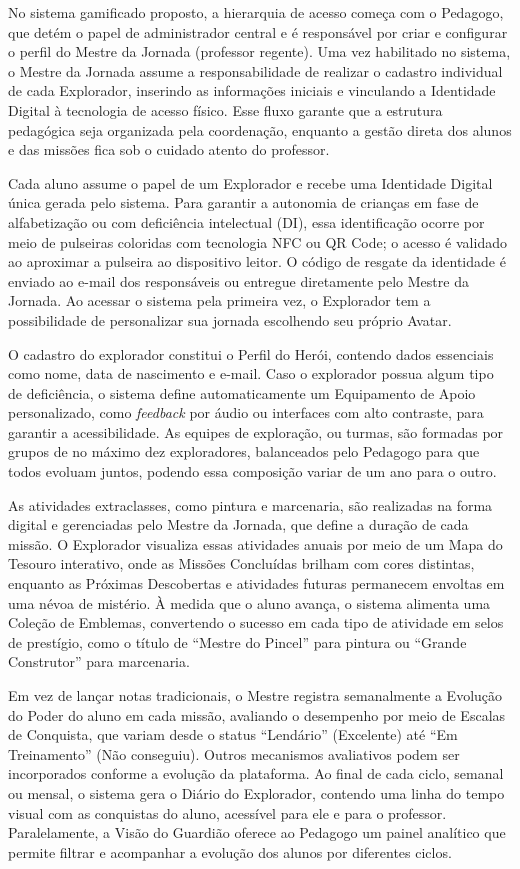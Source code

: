 \documentclass[12pt, a4paper]{article}
\begin{document}
No sistema gamificado proposto, a hierarquia de acesso começa com o Pedagogo,
que detém o papel de administrador central e é responsável por criar e configurar o perfil do
Mestre da Jornada (professor regente). Uma vez habilitado no sistema, o Mestre da Jornada
assume a responsabilidade de realizar o cadastro individual de cada Explorador, inserindo
as informações iniciais e vinculando a Identidade Digital à tecnologia de acesso físico. Esse
fluxo garante que a estrutura pedagógica seja organizada pela coordenação, enquanto a
gestão direta dos alunos e das missões fica sob o cuidado atento do professor.
 
Cada aluno assume o papel de um Explorador e recebe uma Identidade Digital única
gerada pelo sistema. Para garantir a autonomia de crianças em fase de alfabetização ou com
deficiência intelectual (DI), essa identificação ocorre por meio de pulseiras coloridas com
tecnologia NFC ou QR Code; o acesso é validado ao aproximar a pulseira ao dispositivo
leitor. O código de resgate da identidade é enviado ao e-mail dos responsáveis ou
entregue diretamente pelo Mestre da Jornada. Ao acessar o sistema pela primeira vez, o Explorador tem a
possibilidade de personalizar sua jornada escolhendo seu próprio Avatar.
 
O cadastro do explorador constitui o Perfil do Herói, contendo dados essenciais
como nome, data de nascimento e e-mail. Caso o explorador possua algum tipo de
deficiência, o sistema define automaticamente um Equipamento de Apoio personalizado,
como \textit{feedback} por áudio ou interfaces com alto contraste, para garantir a
acessibilidade. As equipes de exploração, ou turmas, são formadas por grupos de no
máximo dez exploradores, balanceados pelo Pedagogo para que todos evoluam juntos,
podendo essa composição variar de um ano para o outro.
 
As atividades extraclasses, como pintura e marcenaria, são realizadas na forma
digital e gerenciadas pelo Mestre da Jornada, que define a duração de cada missão. O
Explorador visualiza essas atividades anuais por meio de um Mapa do Tesouro interativo,
onde as Missões Concluídas brilham com cores distintas, enquanto as Próximas
Descobertas e atividades futuras permanecem envoltas em uma névoa de mistério. À
medida que o aluno avança, o sistema alimenta uma Coleção de Emblemas, convertendo o
sucesso em cada tipo de atividade em selos de prestígio, como o título de ``Mestre do
Pincel'' para pintura ou ``Grande Construtor'' para marcenaria.
 
Em vez de lançar notas tradicionais, o Mestre registra semanalmente a Evolução do
Poder do aluno em cada missão, avaliando o desempenho por meio de Escalas de Conquista,
que variam desde o status ``Lendário'' (Excelente) até ``Em Treinamento'' (Não conseguiu).
Outros mecanismos avaliativos podem ser incorporados conforme a evolução da plataforma. Ao final de cada ciclo, semanal ou mensal, o sistema gera o Diário do
Explorador, contendo uma linha do tempo visual com as conquistas do aluno, acessível para
ele e para o professor. Paralelamente, a Visão do Guardião oferece ao Pedagogo um painel
analítico que permite filtrar e acompanhar a evolução dos alunos por diferentes ciclos.
 
\end{document}
